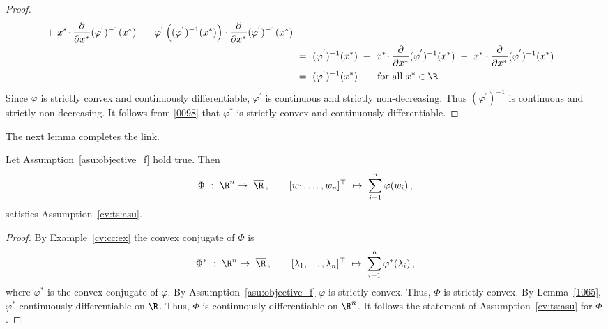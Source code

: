 \begin{proof}
\begin{align}
\begin{split}
    +
    \ 
    x^*
    \!
    \cdot
    \frac{\partial}{\partial x^*}
    (
    \varphi^{'}
    )^{-1}
    (x^*)
    \ 
    -
    \ 
    \varphi^{'}
    \left( 
      (
    \varphi^{'}
    )^{-1}
    (x^*)
    \right)
    \cdot
    \frac{\partial}{\partial x^*}
    (
    \varphi^{'}
    )^{-1}
    (x^*)
    \\
    &
    \ 
    =
    \ 
    (
    \varphi^{'}
    )^{-1}
    (x^*)
    \ 
    +
    \ 
    x^*
    \!
    \cdot
    \frac{\partial}{\partial x^*}
    (
    \varphi^{'}
    )^{-1}
    (x^*)
    \ 
    -
    \ 
    x^*
    \cdot
    \frac{\partial}{\partial x^*}
    (
    \varphi^{'}
    )^{-1}
    (x^*)
    \\
    &
    \ 
    =
    \ 
    (
    \varphi^{'}
    )^{-1}
    (x^*)
    \qquad
    \text{for all}\ 
    x^*\in\R
    \,.
    \end{split}
  \end{align}
  Since $\varphi$ is strictly convex and continuously differentiable, 
  $\varphi^{'}$ is continuous and strictly non-decreasing.
  Thus 
  $
    (
    \varphi^{'}
    )^{-1}
  $
  is continuous and strictly non-decreasing.
  It follows from \eqref{0098} that $\varphi^*$ is strictly convex and continuously differentiable.
\end{proof}
The next lemma completes the link.
\begin{lemma}
  \label{9991}
  Let Assumption~\ref{asu:objective_f} hold true. Then 
\begin{gather*}
  \Phi
  \ 
  :
  \ 
  \R^n
  \to
  \ 
  \overline{\R}
  \,
  ,
  \qquad
  [w_1,\ldots,w_n]^\top
  \ 
  \mapsto
  \ 
  \sum_{i=1}^n \varphi(w_i)
  \,,
\end{gather*}
satisfies Assumption~\ref{cv:ts:asu}.
\end{lemma}
\begin{proof}
  By Example~\ref{cv:cc:ex}
  the convex conjugate of $\Phi$ is 
\begin{gather*}
  \Phi^*
  \ 
  :
  \ 
  \R^n
  \to
  \ 
  \overline{\R}
  \,
  ,
  \qquad
  [\lambda_1,\ldots,\lambda_n]^\top
  \ 
  \mapsto
  \ 
  \sum_{i=1}^n \varphi^*(\lambda_i)
  \,,
\end{gather*}
where $\varphi^*$ is the convex conjugate of $\varphi$.
By Assumption~\ref{asu:objective_f} $\varphi$ is strictly convex. Thus,
$\Phi$ is strictly convex. By Lemma~\ref{1065}, $\varphi^*$ continuously differentiable on $\R$. Thus,
$\Phi$ is continuously differentiable on $\R^n$.
It follows the statement of Assumption~\ref{cv:ts:asu} for $\Phi$.
\end{proof}
